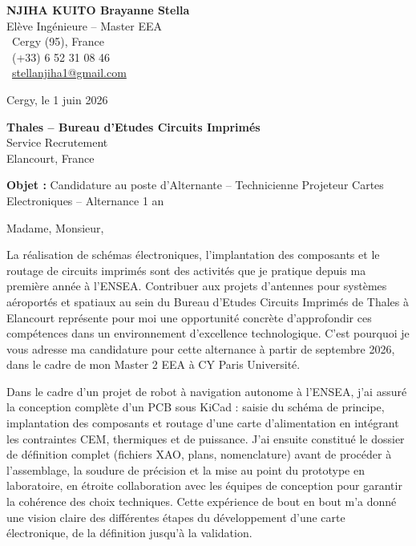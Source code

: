 \documentclass[a4paper,11pt]{article}
\begin{document}
\noindent
\begin{minipage}[t]{0.5\textwidth}
    \textbf{NJIHA KUITO Brayanne Stella}\\
    Elève Ingénieure -- Master EEA\\[3pt]
    \faMapMarker\ Cergy (95), France\\
    \faPhone\ (+33) 6 52 31 08 46\\
    \faEnvelope\ \href{mailto:stellanjiha1@gmail.com}{stellanjiha1@gmail.com}
\end{minipage}
\hfill
\begin{minipage}[t]{0.4\textwidth}
    \raggedleft
    Cergy, le 1 juin 2026
\end{minipage}

\vspace{1.2cm}

\hfill
\begin{minipage}[t]{0.5\textwidth}
    \raggedleft
    \textbf{Thales -- Bureau d'Etudes Circuits Imprimés}\\
    Service Recrutement\\
    Elancourt, France
\end{minipage}

\vspace{1cm}

\noindent\textbf{Objet :} Candidature au poste d'Alternante -- Technicienne Projeteur Cartes Electroniques -- Alternance 1 an

\vspace{0.8cm}

Madame, Monsieur,

La réalisation de schémas électroniques, l'implantation des composants et le routage de circuits imprimés sont des activités que je pratique depuis ma première année à l'ENSEA. Contribuer aux projets d'antennes pour systèmes aéroportés et spatiaux au sein du Bureau d'Etudes Circuits Imprimés de Thales à Elancourt représente pour moi une opportunité concrète d'approfondir ces compétences dans un environnement d'excellence technologique. C'est pourquoi je vous adresse ma candidature pour cette alternance à partir de septembre 2026, dans le cadre de mon Master 2 EEA à CY Paris Université.

Dans le cadre d'un projet de robot à navigation autonome à l'ENSEA, j'ai assuré la conception complète d'un PCB sous KiCad : saisie du schéma de principe, implantation des composants et routage d'une carte d'alimentation en intégrant les contraintes CEM, thermiques et de puissance. J'ai ensuite constitué le dossier de définition complet (fichiers XAO, plans, nomenclature) avant de procéder à l'assemblage, la soudure de précision et la mise au point du prototype en laboratoire, en étroite collaboration avec les équipes de conception pour garantir la cohérence des choix techniques. Cette expérience de bout en bout m'a donné une vision claire des différentes étapes du développement d'une carte électronique, de la définition jusqu'à la validation.
\end{document}
